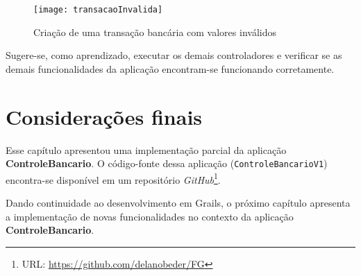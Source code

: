 \begin{figure}[htbp]
\centering\texttt{[image: transacaoInvalida]}
\caption{Criação de uma transação bancária com valores inválidos}
\label{transacaoInvalidaFig}
\end{figure}

\vspace{0.5cm}

\begin{remark}
Sugere-se, como aprendizado, executar os  demais controladores e verificar se as
demais funcionalidades da aplicação encontram-se funcionando corretamente.
\end{remark}

\section{Considerações finais}

\vspace{0.3cm}

Esse   capítulo  apresentou   uma  implementação   parcial  da   aplicação  {\bf
  ControleBancario}.         O        código-fonte        dessa        aplicação
({\footnotesize\texttt{ControleBancarioV1}})   encontra-se   disponível  em   um
repositório                      {\it                      GitHub}\footnote{URL:
  {\url{https://github.com/delanobeder/FG}}}.  

\vspace{0.2cm}

Dando continuidade ao desenvolvimento em Grails, o próximo capítulo apresenta a
implementação   de  novas   funcionalidades  no   contexto  da   aplicação  {\bf
  ControleBancario}.  


